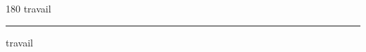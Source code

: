 
\begin{frame}
\begin{center}
\begin{turn}{180}
{\fontsize{2.5cm}{1em}\selectfont travail}
\end{turn}
\vspace{1em}\par  
\hrule
\vspace{1em}\par  
{\fontsize{2.5cm}{1em}\selectfont travail}
\end{center}
\end{frame}
